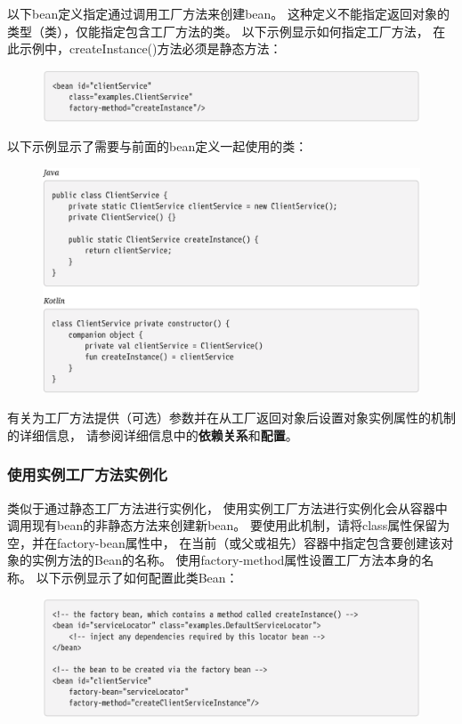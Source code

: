 以下bean定义指定通过调用工厂方法来创建bean。 
这种定义不能指定返回对象的类型（类），仅能指定包含工厂方法的类。  以下示例显示如何指定工厂方法，
在此示例中，createInstance()方法必须是静态方法：

\begin{figure}[ht]
    \centering
    \includegraphics[width=1\linewidth]{./Figure/IMG_code_15.png}
\end{figure}

以下示例显示了需要与前面的bean定义一起使用的类：

\begin{figure}[ht]
    \centering
    \includegraphics[width=1\linewidth]{./Figure/IMG_code_16.png}
\end{figure}

有关为工厂方法提供（可选）参数并在从工厂返回对象后设置对象实例属性的机制的详细信息，
请参阅详细信息中的\textbf{依赖关系}和\textbf{配置}。

\subsubsection{使用实例工厂方法实例化}
类似于通过静态工厂方法进行实例化，
使用实例工厂方法进行实例化会从容器中调用现有bean的非静态方法来创建新bean。 
要使用此机制，请将class属性保留为空，并在factory-bean属性中，
在当前（或父或祖先）容器中指定包含要创建该对象的实例方法的Bean的名称。 
使用factory-method属性设置工厂方法本身的名称。 以下示例显示了如何配置此类Bean：

\begin{figure}[ht]
    \centering
    \includegraphics[width=1\linewidth]{./Figure/IMG_code_17.png}
\end{figure}

